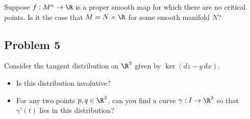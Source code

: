 \documentclass[12pt]{handout}
\begin{document}
Suppose $f : M^n \to \R$ is a proper smooth map for which there are no
critical points.  Is it the case that $M = N \times \R$ for some
smooth manifold $N$?

\subsection*{Problem 5}

Consider the tangent distribution on $\R^3$ given by $\ker \left( dz - y \, dx \right)$.
\begin{itemize}
\item Is this distribution involutive?
\item For any two points $p, q \in \R^3$, can you find a curve $\gamma : I
\to \R^3$ so that $\gamma'(t)$ lies in this distribution?
\end{itemize}
\end{document}
